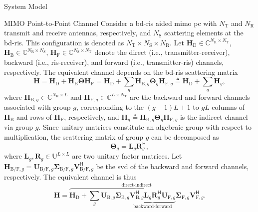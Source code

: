 \documentclass[journal]{IEEEtran}
\begin{document}
\begin{section}{System Model}
	\begin{subsection}{MIMO Point-to-Point Channel}
		Consider a \gls{bd}-\gls{ris} aided \gls{mimo} \gls{pc} with $N_\mathrm{T}$ and $N_\mathrm{R}$ transmit and receive antennas, respectively, and $N_\mathrm{S}$ scattering elements at the \gls{bd}-\gls{ris}.
		This configuration is denoted as $N_\mathrm{T} \times N_\mathrm{S} \times N_\mathrm{R}$.
		Let $\mathbf{H}_\mathrm{D} \in \mathbb{C}^{N_\mathrm{R} \times N_\mathrm{T}}$, $\mathbf{H}_\mathrm{B} \in \mathbb{C}^{N_\mathrm{R} \times N_\mathrm{S}}$, $\mathbf{H}_\mathrm{F} \in \mathbb{C}^{N_\mathrm{S} \times N_\mathrm{T}}$ denote the direct (i.e., transmitter-receiver), backward (i.e., \gls{ris}-receiver), and forward (i.e., transmitter-\gls{ris}) channels, respectively.
		The equivalent channel depends on the \gls{bd}-\gls{ris} scattering matrix
		\begin{equation}
			\label{eq:channel}
			\mathbf{H} = \mathbf{H}_\mathrm{D} + \mathbf{H}_\mathrm{B} \mathbf{\Theta} \mathbf{H}_\mathrm{F} = \mathbf{H}_\mathrm{D} + \sum_g \mathbf{H}_{\mathrm{B},g} \mathbf{\Theta}_g \mathbf{H}_{\mathrm{F},g} \triangleq \mathbf{H}_\mathrm{D} + \sum_g \mathbf{H}_g,
		\end{equation}
		where $\mathbf{H}_{\mathrm{B},g} \in \mathbb{C}^{N_\mathrm{R} \times L}$ and $\mathbf{H}_{\mathrm{F},g} \in \mathbb{C}^{L \times N_\mathrm{T}}$ are the backward and forward channels associated with group $g$, corresponding to the $(g{-}1)L{+}1$ to $gL$ columns of $\mathbf{H}_\mathrm{B}$ and rows of $\mathbf{H}_\mathrm{F}$, respectively, and $\mathbf{H}_g \triangleq \mathbf{H}_{\mathrm{B},g} \mathbf{\Theta}_g \mathbf{H}_{\mathrm{F},g}$ is the indirect channel via group $g$.
		Since unitary matrices constitute an algebraic group with respect to multiplication, the scattering matrix of group $g$ can be decomposed as
		\begin{equation}
			\mathbf{\Theta}_g = \mathbf{L}_g \mathbf{R}_g^\mathsf{H},
		\end{equation}
		where $\mathbf{L}_g, \mathbf{R}_g \in \mathbb{U}^{L \times L}$ are two unitary factor matrices.
		Let $\mathbf{H}_{\mathrm{B/F},g} = \mathbf{U}_{\mathrm{B/F},g} \mathbf{\Sigma}_{\mathrm{B/F},g} \mathbf{V}_{\mathrm{B/F},g}^\mathsf{H}$ be the \gls{svd} of the backward and forward channels, respectively.
		The equivalent channel is thus
		\begin{equation}
			\label{eq:channel_svd}
			\mathbf{H} = \overbrace{\mathbf{H}_\mathrm{D} + \sum_g \mathbf{U}_{\mathrm{B},g} \mathbf{\Sigma}_{\mathrm{B},g} \underbrace{\mathbf{V}_{\mathrm{B},g}^\mathsf{H} \mathbf{L}_g \mathbf{R}_g^\mathsf{H} \mathbf{U}_{\mathrm{F},g}}_\text{backward-forward} \mathbf{\Sigma}_{\mathrm{F},g} \mathbf{V}_{\mathrm{F},g}^\mathsf{H}}^\text{direct-indirect}.
		\end{equation}


\end{subsection}
\end{section}
\end{document}
